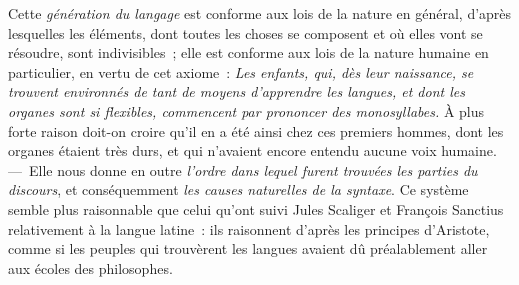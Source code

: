 \documentclass[french,twoside]{book} %
\begin{document}
Cette {\itshape génération du langage} est conforme aux lois  de la nature en général, d’après lesquelles les éléments, dont toutes les choses se composent et où elles vont se résoudre, sont indivisibles ; elle est conforme aux lois de la nature humaine en particulier, en vertu de cet axiome : {\itshape Les enfants, qui, dès leur naissance, se trouvent environnés de tant de moyens d’apprendre les langues, et dont les organes sont si flexibles, commencent par prononcer des monosyllabes.} À plus forte raison doit-on croire qu’il en a été ainsi chez ces premiers hommes, dont les organes étaient très durs, et qui n’avaient encore entendu aucune voix humaine. — Elle nous donne en outre {\itshape l’ordre dans lequel furent trouvées les parties du discours}, et conséquemment {\itshape les causes naturelles de la syntaxe}. Ce système semble plus raisonnable que celui qu’ont suivi Jules Scaliger et François Sanctius relativement à la langue latine : ils raisonnent d’après les principes d’Aristote, comme si les peuples qui trouvèrent les langues avaient dû préalablement aller aux écoles des philosophes.
\end{document}
